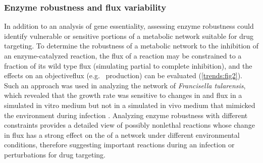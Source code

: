 \subsubsection{Enzyme robustness and flux variability}
In addition to an analysis of gene essentiality, assessing enzyme 
robustness could identify vulnerable or sensitive portions of a 
metabolic network suitable for drug targeting. To determine the 
robustness of a metabolic network to the inhibition of an 
enzyme-catalyzed reaction, the \gls{flux} of a reaction may be constrained 
to a fraction of its wild type \gls{flux} (simulating partial to 
complete inhibition), and the effects on an \gls{objectiveflux} 
(e.g.\  production) can be evaluated \cite{Edwards:2000cz} (\autoref{trends:fig2}). 
Such an approach was used in analyzing the network  
of \textit{Francisella tularensis}, which revealed that the growth rate 
was sensitive to changes in  and  \gls{flux} in a simulated in vitro 
medium but not in a simulated in vivo medium that mimicked the 
environment during infection \cite{Raghunathan:2010gl}. Analyzing enzyme robustness with 
different constraints provides a detailed view of possibly nonlethal 
reactions whose change in \gls{flux} has a strong effect on the  
of a network under different environmental conditions, therefore 
suggesting important reactions during an infection or perturbations 
for drug targeting.

